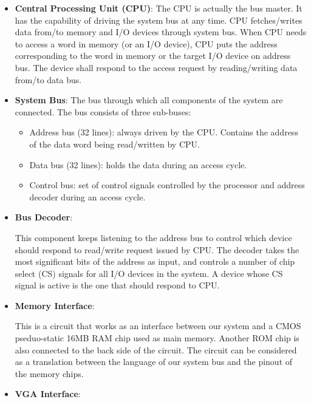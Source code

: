 \documentclass[oneside]{book}
\begin{document}
\begin{itemize}

\item \textbf{Central Processing Unit (CPU)}:
The CPU is actually the bus master. It has the capability of
driving the system bus at any time. CPU fetches/writes data from/to
memory and I/O devices through system bus. When CPU needs to access
a word in memory (or an I/O device), CPU puts the address corresponding
to the word in memory or the target I/O device on address bus. The device
shall respond to the access request by reading/writing data from/to data
bus.

\item \textbf{System Bus}:
The bus through which all components of the system are connected. The bus
consists of three sub-buses:

\begin{itemize}

\item Address bus (32 lines): always driven by the CPU. Contains the address
of the data word being read/written by CPU.

\item Data bus (32 lines): holds the data during an access cycle.

\item Control bus: set of control signals controlled by the processor and
address decoder during an access cycle.

\end{itemize}

\item \textbf{Bus Decoder}:

This component keeps listening to the address bus to control which device
should respond to read/write request issued by CPU. The decoder takes
the most significant bits of the address as input, and controls a number
of chip select (CS) signals for all I/O devices in the system. A device
whose CS signal is active is the one that should respond to CPU.

\item \textbf{Memory Interface}:

This is a circuit that works as an interface between our system and a CMOS
pseduo-static 16MB RAM chip used as main memory. Another ROM chip is also
connected to the back side of the circuit. The circuit can be considered as
a translation between the language of our system bus and the pinout
of the memory chips.

\item \textbf{VGA Interface}:


\end{itemize}
\end{document}
